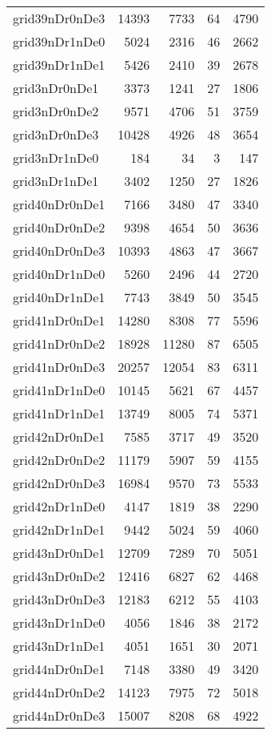 \begin{longtable}{lrrrr}
grid39nDr0nDe3 & 14393 & 7733 & 64 & 4790 \\
grid39nDr1nDe0 & 5024 & 2316 & 46 & 2662 \\
grid39nDr1nDe1 & 5426 & 2410 & 39 & 2678 \\
grid3nDr0nDe1 & 3373 & 1241 & 27 & 1806 \\
grid3nDr0nDe2 & 9571 & 4706 & 51 & 3759 \\
grid3nDr0nDe3 & 10428 & 4926 & 48 & 3654 \\
grid3nDr1nDe0 & 184 & 34 & 3 & 147 \\
grid3nDr1nDe1 & 3402 & 1250 & 27 & 1826 \\
grid40nDr0nDe1 & 7166 & 3480 & 47 & 3340 \\
grid40nDr0nDe2 & 9398 & 4654 & 50 & 3636 \\
grid40nDr0nDe3 & 10393 & 4863 & 47 & 3667 \\
grid40nDr1nDe0 & 5260 & 2496 & 44 & 2720 \\
grid40nDr1nDe1 & 7743 & 3849 & 50 & 3545 \\
grid41nDr0nDe1 & 14280 & 8308 & 77 & 5596 \\
grid41nDr0nDe2 & 18928 & 11280 & 87 & 6505 \\
grid41nDr0nDe3 & 20257 & 12054 & 83 & 6311 \\
grid41nDr1nDe0 & 10145 & 5621 & 67 & 4457 \\
grid41nDr1nDe1 & 13749 & 8005 & 74 & 5371 \\
grid42nDr0nDe1 & 7585 & 3717 & 49 & 3520 \\
grid42nDr0nDe2 & 11179 & 5907 & 59 & 4155 \\
grid42nDr0nDe3 & 16984 & 9570 & 73 & 5533 \\
grid42nDr1nDe0 & 4147 & 1819 & 38 & 2290 \\
grid42nDr1nDe1 & 9442 & 5024 & 59 & 4060 \\
grid43nDr0nDe1 & 12709 & 7289 & 70 & 5051 \\
grid43nDr0nDe2 & 12416 & 6827 & 62 & 4468 \\
grid43nDr0nDe3 & 12183 & 6212 & 55 & 4103 \\
grid43nDr1nDe0 & 4056 & 1846 & 38 & 2172 \\
grid43nDr1nDe1 & 4051 & 1651 & 30 & 2071 \\
grid44nDr0nDe1 & 7148 & 3380 & 49 & 3420 \\
grid44nDr0nDe2 & 14123 & 7975 & 72 & 5018 \\
grid44nDr0nDe3 & 15007 & 8208 & 68 & 4922 \\

\end{longtable}
